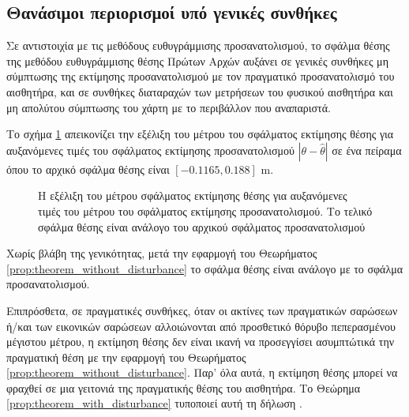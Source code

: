 \subsection{Θανάσιμοι περιορισμοί υπό γενικές συνθήκες}
\label{subsection:02_04_03:02}

Σε αντιστοιχία με τις μεθόδους ευθυγράμμισης προσανατολισμού, το σφάλμα θέσης
της μεθόδου ευθυγράμμισης θέσης Πρώτων Αρχών αυξάνει σε γενικές συνθήκες μη
σύμπτωσης της εκτίμησης προσανατολισμού με τον πραγματικό προσανατολισμό του
αισθητήρα, και σε συνθήκες διαταραχών των μετρήσεων του φυσικού αισθητήρα και
μη απολύτου σύμπτωσης του χάρτη με το περιβάλλον που αναπαριστά.

Το σχήμα \ref{fig:02_04_03:tc_x1_non_convergence} απεικονίζει την εξέλιξη του
μέτρου του σφάλματος εκτίμησης θέσης για αυξανόμενες τιμές του σφάλματος
εκτίμησης προσανατολισμού $|\theta - \hat{\theta}|$ σε ένα πείραμα όπου το
αρχικό σφάλμα θέσης είναι $[-0.1165, 0.188]$ m.

\begin{figure}[!h]\centering
  
  \caption{\small Η εξέλιξη του μέτρου σφάλματος εκτίμησης θέσης για αυξανόμενες
           τιμές του μέτρου του σφάλματος εκτίμησης προσανατολισμού. Το τελικό
           σφάλμα θέσης είναι ανάλογο του αρχικού σφάλματος προσανατολισμού}
  \label{fig:02_04_03:tc_x1_non_convergence}
\end{figure}

\begin{gg_box}
\begin{remark}
  \label{remark:loc_prop_or}
  Χωρίς βλάβη της γενικότητας, μετά την εφαρμογή του Θεωρήματος
  \ref{prop:theorem_without_disturbance} το σφάλμα θέσης είναι ανάλογο με το
  σφάλμα προσανατολισμού.
\end{remark}
\end{gg_box}

Επιπρόσθετα, σε πραγματικές συνθήκες, όταν οι ακτίνες των πραγματικών σαρώσεων
ή/και των εικονικών σαρώσεων αλλοιώνονται από προσθετικό θόρυβο πεπερασμένου
μέγιστου μέτρου, η εκτίμηση θέσης δεν είναι ικανή να προσεγγίσει ασυμπτώτικά
την πραγματική θέση με την εφαρμογή του Θεωρήματος
\ref{prop:theorem_without_disturbance}. Παρ' όλα αυτά, η εκτίμηση θέσης μπορεί
να φραχθεί σε μια γειτονιά της πραγματικής θέσης του αισθητήρα. Το Θεώρημα
\ref{prop:theorem_with_disturbance} τυποποιεί αυτή τη δήλωση
\cite{Filotheou2022d}.


